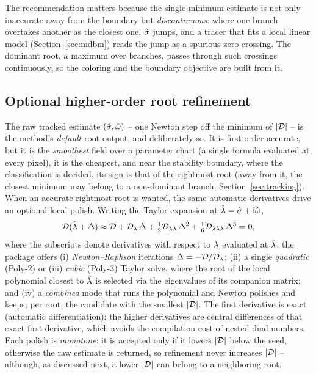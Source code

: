 The recommendation matters because the single-minimum estimate is not only
inaccurate away from the boundary but \emph{discontinuous}: where one branch
overtakes another as the closest one, $\hat{\sigma}$ jumps, and a tracer that fits a
local linear model (Section~\ref{sec:mdbm}) reads the jump as a spurious zero
crossing. The dominant root, a maximum over branches, passes through such
crossings continuously, so the coloring and the boundary objective are built
from it.

\subsection{Optional higher-order root refinement}\label{sec:refinement}

The raw tracked estimate $(\hat{\sigma},\hat{\omega})$ -- one Newton step off the minimum
of $|\mathcal{D}|$ -- is the method's \emph{default} root output, and deliberately
so. It is first-order accurate, but it is the \emph{smoothest} field over a
parameter chart (a single formula evaluated at every pixel), it is the
cheapest, and near the stability boundary, where the classification is
decided, its sign is that of the rightmost root (away from it, the closest
minimum may belong to a non-dominant branch, Section~\ref{sec:tracking}).
When an accurate rightmost root is wanted, the same automatic
derivatives drive an optional local polish. Writing the Taylor expansion at
$\hat{\lambda}=\hat{\sigma}+\mathrm{i}\hat{\omega}$,
\begin{equation}\label{eq:taylor}
  \mathcal{D}(\hat{\lambda}+\Delta) \approx \mathcal{D} + \mathcal{D}_\lambda\,\Delta
   + \tfrac12 \mathcal{D}_{\lambda\lambda}\,\Delta^{2}
   + \tfrac16 \mathcal{D}_{\lambda\lambda\lambda}\,\Delta^{3} = 0,
\end{equation}
where the subscripts denote derivatives with respect to $\lambda$ evaluated at
$\hat{\lambda}$, the package offers (i) \emph{Newton--Raphson} iterations
$\Delta=-\mathcal{D}/\mathcal{D}_\lambda$; (ii) a single \emph{quadratic} (Poly-2) or (iii)
\emph{cubic} (Poly-3) Taylor solve, where the root of the local polynomial
closest to $\hat{\lambda}$ is selected via the eigenvalues of its companion matrix;
and (iv) a \emph{combined} mode that runs the polynomial and Newton polishes
and keeps, per root, the candidate with the smallest $|\mathcal{D}|$. The first
derivative is exact (automatic differentiation); the higher derivatives are
central differences of that exact first derivative, which avoids the
compilation cost of nested dual numbers. Each polish is \emph{monotone}: it is
accepted only if it lowers $|\mathcal{D}|$ below the seed, otherwise the raw estimate
is returned, so refinement never increases $|\mathcal{D}|$ -- although, as discussed
next, a lower $|\mathcal{D}|$ can belong to a neighboring root.

